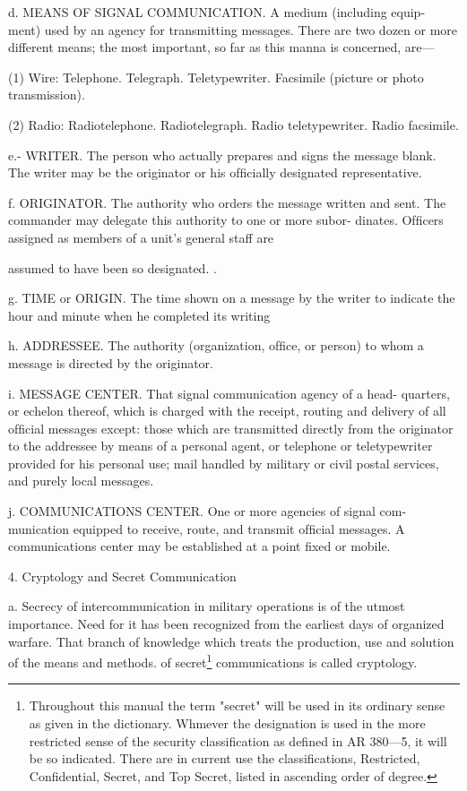 d. MEANS OF SIGNAL COMMUNICATION. A medium (including equip-
ment) used by an agency for transmitting messages. There are two
dozen or more different means; the most important, so far as this manna
is concerned, are—

(1) Wire:
Telephone.
Telegraph.
Teletypewriter.
Facsimile (picture or photo transmission).

(2) Radio:
Radiotelephone.
Radiotelegraph.
Radio teletypewriter.
Radio facsimile.

e.- WRITER. The person who actually prepares and signs the message
blank. The writer may be the originator or his ofﬁcially designated
representative.

f. ORIGINATOR. The authority who orders the message written and
sent. The commander may delegate this authority to one or more subor-
dinates. Ofﬁcers assigned as members of a unit’s general staff are

assumed to have been so designated. .

g. TIME or ORIGIN. The time shown on a message by the writer to
indicate the hour and minute when he completed its writing

h. ADDRESSEE. The authority (organization, ofﬁce, or person) to whom
a message is directed by the originator.

i. MESSAGE CENTER. That signal communication agency of a head-
quarters, or echelon thereof, which is charged with the receipt, routing
and delivery of all ofﬁcial messages except: those which are transmitted
directly from the originator to the addressee by means of a personal
agent, or telephone or teletypewriter provided for his personal use; mail
handled by military or civil postal services, and purely local messages.

j. COMMUNICATIONS CENTER. One or more agencies of signal com-
munication equipped to receive, route, and transmit ofﬁcial messages. A
communications center may be established at a point ﬁxed or mobile.

4. Cryptology and Secret Communication

a. Secrecy of intercommunication in military operations is of the
utmost importance. Need for it has been recognized from the earliest
days of organized warfare. That branch of knowledge which treats the
production, use and solution of the means and methods. of secret\footnote{ Throughout this manual the term "secret" will be used in its ordinary sense as given in the dictionary. Whmever the designation is used in the more restricted sense of the security classiﬁcation as deﬁned in AR 380—5, it will be so indicated. There are in current use the classiﬁcations, Restricted, Conﬁdential, Secret, and Top Secret, listed in ascending order of degree.} communications is called cryptology.



